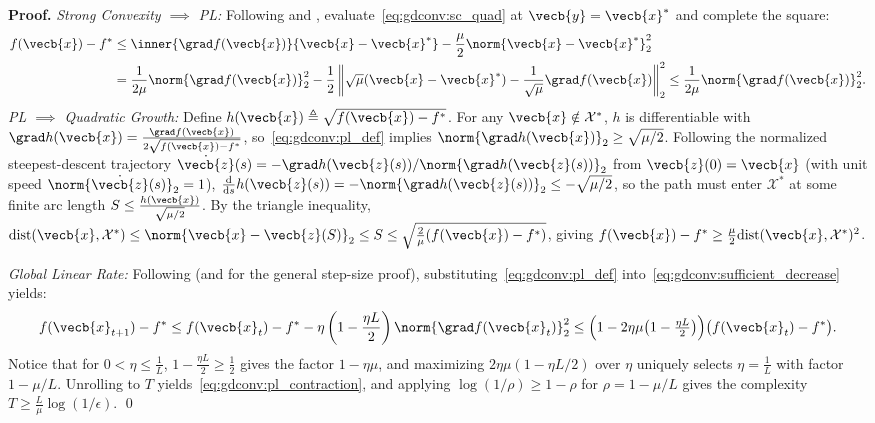 \documentclass[../../../../master.tex]{subfiles}
\begin{document}
\textbf{Proof.}
\emph{Strong Convexity $\implies$ PL:} Following  and , evaluate~\eqref{eq:gdconv:sc_quad} at $\vecb{y} = \vecb{x}^*$ and complete the square:
\begin{align*}
  f(\vecb{x}) - f^* &\le \inner{\grad f(\vecb{x})}{\vecb{x} - \vecb{x}^*} - \frac{\mu}{2}\norm{\vecb{x}-\vecb{x}^*}_2^2 \\
  &= \frac{1}{2\mu}\norm{\grad f(\vecb{x})}_2^2 - \frac{1}{2}\left\|\sqrt{\mu}(\vecb{x}-\vecb{x}^*) - \frac{1}{\sqrt{\mu}}\grad f(\vecb{x})\right\|_2^2 \le \frac{1}{2\mu}\norm{\grad f(\vecb{x})}_2^2.
\end{align*}
\emph{PL $\implies$ Quadratic Growth:} Define $h(\vecb{x}) \triangleq \sqrt{f(\vecb{x}) - f^*}$. For any $\vecb{x} \notin \mathcal{X}^*$, $h$ is differentiable with $\grad h(\vecb{x}) = \frac{\grad f(\vecb{x})}{2\sqrt{f(\vecb{x})-f^*}}$, so~\eqref{eq:gdconv:pl_def} implies $\norm{\grad h(\vecb{x})}_2 \ge \sqrt{\mu/2}$. Following the normalized steepest-descent trajectory $\dot{\vecb{z}}(s) = -\grad h(\vecb{z}(s))/\norm{\grad h(\vecb{z}(s))}_2$ from $\vecb{z}(0) = \vecb{x}$ (with unit speed $\norm{\dot{\vecb{z}}(s)}_2 = 1$), $\frac{\mathrm{d}}{\mathrm{d}s} h(\vecb{z}(s)) = -\norm{\grad h(\vecb{z}(s))}_2 \le -\sqrt{\mu/2}$, so the path must enter $\mathcal{X}^*$ at some finite arc length $S \le \frac{h(\vecb{x})}{\sqrt{\mu/2}}$. By the triangle inequality, $\mathrm{dist}(\vecb{x}, \mathcal{X}^*) \le \norm{\vecb{x} - \vecb{z}(S)}_2 \le S \le \sqrt{\frac{2}{\mu}(f(\vecb{x}) - f^*)}$, giving $f(\vecb{x}) - f^* \ge \frac{\mu}{2}\mathrm{dist}(\vecb{x},\mathcal{X}^*)^2$.

\emph{Global Linear Rate:} Following  (and  for the general step-size proof), substituting~\eqref{eq:gdconv:pl_def} into~\eqref{eq:gdconv:sufficient_decrease} yields:
\[
  f(\vecb{x}_{t+1}) - f^* \le f(\vecb{x}_t) - f^* - \eta\left(1 - \frac{\eta L}{2}\right)\norm{\grad f(\vecb{x}_t)}_2^2
  \le \Big(1 - 2\eta\mu\big(1 - \tfrac{\eta L}{2}\big)\Big)\big(f(\vecb{x}_t) - f^*\big).
\]
Notice that for $0 < \eta \le \frac{1}{L}$, $1 - \frac{\eta L}{2} \ge \frac{1}{2}$ gives the factor $1 - \eta\mu$, and maximizing $2\eta\mu(1 - \eta L/2)$ over $\eta$ uniquely selects $\eta = \frac{1}{L}$ with factor $1 - \mu/L$. Unrolling to $T$ yields~\eqref{eq:gdconv:pl_contraction}, and applying $\log(1/\rho) \ge 1 - \rho$ for $\rho = 1 - \mu/L$  gives the complexity $T \ge \frac{L}{\mu}\log(1/\epsilon)$. \qed
\end{document}

